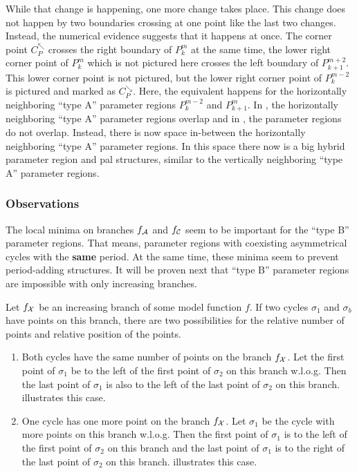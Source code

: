 While that change is happening, one more change takes place.
This change does not happen by two boundaries crossing at one point like the last two changes.
Instead, the numerical evidence suggests that it happens at once.
The corner point $C_P^\nwarrow$ crosses the right boundary of $P^m_k$ at the same time, the lower right corner point of $P^{m}_{k}$ which is not pictured here crosses the left boundary of $P^{m+2}_{k+1}$.
This lower corner point is not pictured, but the lower right corner point of $P^{m-2}_k$ is pictured and marked as $C_P^\searrow$.
Here, the equivalent happens for the horizontally neighboring ``type A'' parameter regions $P^{m-2}_k$ and $P^m_{k+1}$.
In , the horizontally neighboring ``type A'' parameter regions overlap and in , the parameter regions do not overlap.
Instead, there is now space in-between the horizontally neighboring ``type A'' parameter regions.
In this space there now is a big hybrid parameter region and \gls{pal} structures, similar to the vertically neighboring ``type A'' parameter regions.

\subsubsection{Observations}

The local minima on branches $f_{\mathcal{A}}$ and $f_{\mathcal{C}}$ seem to be important for the ``type B'' parameter regions.
That means, parameter regions with coexisting asymmetrical cycles with the \textbf{same} period.
At the same time, these minima seem to prevent period-adding structures.
It will be proven next that ``type B'' parameter regions are impossible with only increasing branches.

\begin{lemma}
	Let $f_{\mathcal{X}}$ be an increasing branch of some model function $f$.
	If two cycles $\sigma_1$ and $\sigma_b$ have points on this branch, there are two possibilities for the relative number of points and relative position of the points.
	\begin{enumerate}
		\item Both cycles have the same number of points on the branch $f_{\mathcal{X}}$.
		      Let the first point of $\sigma_1$ be to the left of the first point of $\sigma_2$ on this branch w.l.o.g.
		      Then the last point of $\sigma_1$ is also to the left of the last point of $\sigma_2$ on this branch.
		       illustrates this case.
		\item One cycle has one more point on the branch $f_{\mathcal{X}}$.
		      Let $\sigma_1$ be the cycle with more points on this branch w.l.o.g.
		      Then the first point of $\sigma_1$ is to the left of the first point of $\sigma_2$ on this branch and the last point of $\sigma_1$ is to the right of the last point of $\sigma_2$ on this branch.
		       illustrates this case.
	\end{enumerate}
	\label{lemma:add.num.pos.points.increasing}
\end{lemma}

